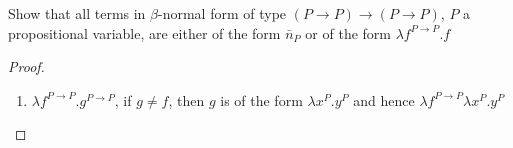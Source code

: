 \documentclass[11pt]{article}
\begin{document}
\begin{exercise}
Show that all terms in \(\beta\)-normal form of type \((P\to P)\to(P\to P)\), \(P\) a
propositional variable, are either of the form \(\bar{n}_P\) or of the form
\(\lambda f^{P\to P}.f\)
\end{exercise}
\begin{proof}
\begin{enumerate}
\item \(\lambda f^{P\to P}.g^{P\to P}\), if \(g\neq f\), then \(g\) is of the form
\(\lambda x^P.y^P\) and hence \(\lambda f^{P\to P}\lambda x^P.y^P\)
\end{enumerate}
\end{proof}
\end{document}
